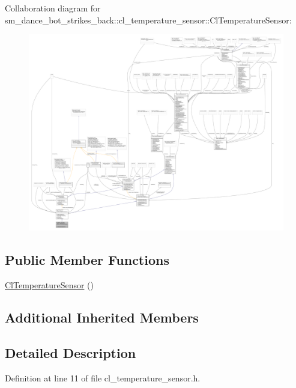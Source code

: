 Collaboration diagram for sm\+\_\+dance\+\_\+bot\+\_\+strikes\+\_\+back\+:\+:cl\+\_\+temperature\+\_\+sensor\+:\+:Cl\+Temperature\+Sensor\+:
\nopagebreak
\begin{figure}[H]
\begin{center}
\leavevmode
\includegraphics[width=350pt]{classsm__dance__bot__strikes__back_1_1cl__temperature__sensor_1_1ClTemperatureSensor__coll__graph}
\end{center}
\end{figure}
\subsection*{Public Member Functions}
\begin{DoxyCompactItemize}
\item 
\hyperlink{classsm__dance__bot__strikes__back_1_1cl__temperature__sensor_1_1ClTemperatureSensor_ae09d17f596554599b749158b63842df7}{Cl\+Temperature\+Sensor} ()
\end{DoxyCompactItemize}
\subsection*{Additional Inherited Members}


\subsection{Detailed Description}


Definition at line 11 of file cl\+\_\+temperature\+\_\+sensor.\+h.



